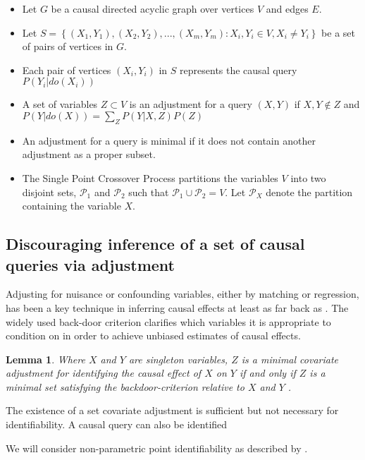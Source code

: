 \documentclass{article}
\newcommand{\set}[1]{\left\{#1\right\}}
\newcommand{\pt}{\mathcal P}
\theoremstyle{plain}
\newtheorem{lemma}[theorem]{Lemma}
\theoremstyle{definition}
\begin{document}
\begin{itemize}
\item Let $G$ be a causal directed acyclic graph over vertices $V$ and edges $E$.
\item Let $S = \set{(X_1,Y_1),(X_2,Y_2),...,(X_m,Y_m): X_i,Y_i \in V,X_i \neq Y_i}$ be a set of pairs of vertices in $G$.
\item Each pair of vertices $(X_i,Y_i)$ in $S$ represents the causal query $P(Y_i|do(X_i))$
\item A set of variables $Z \subset V$ is an adjustment for a query $(X,Y)$ if $X, Y \notin Z$ and $P(Y|do(X)) = \sum_Z P(Y|X,Z)P(Z)$
\item An adjustment for a query is minimal if it does not contain another adjustment as a proper subset.
\item The Single Point Crossover Process partitions the variables $V$ into two disjoint sets, $\pt_1$ and $\pt_2$ such that $\pt_1 \cup \pt_2 = V$. Let $\pt_X$ denote the partition containing the variable $X$.
\end{itemize}

\subsection{Discouraging inference of a set of causal queries via adjustment}


Adjusting for nuisance or confounding variables, either by matching or regression, has been a key technique in inferring causal effects at least as far back as \cite{}. The widely used back-door criterion \cite{Pearl2000} clarifies which variables it is appropriate to condition on in order to achieve unbiased estimates of causal effects. 

\begin{lemma}Where $X$ and $Y$ are singleton variables, $Z$ is a minimal covariate adjustment for identifying the causal effect of $X$ on $Y$ if and only if $Z$ is a minimal set satisfying the backdoor-criterion relative to $X$ and $Y$ \cite{textor2012adjustment}.
\end{lemma}
 
The existence of a set covariate adjustment is sufficient but not necessary for identifiability. A causal query can also be identified 


We will consider non-parametric point identifiability as described by \cite{Pearl2000}. 
\end{document}
